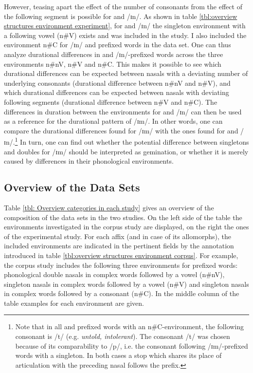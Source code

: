 However, teasing apart the effect of the number of consonants from the effect of the following segment is possible for  and /ɪn/. As shown in table \ref{tbl:overview structures environment experiment}, for  and /ɪn/ the singleton environment with a following vowel (n\#V) exists and was included in the study. I also included the environment n\#C for /ɪn/ and prefixed words in the data set.
 One can thus analyze durational differences in  and /ɪn/-prefixed words across the three environments  n\#nV, n\#V and n\#C. 
This makes it possible to see which durational differences can be expected between nasals with a deviating number of underlying consonants (durational difference between n\#nV and n\#V), and which durational differences can be expected between nasals with deviating following segments (durational difference between n\#V and n\#C). 
The differences in duration between the environments for  and /ɪn/ can then be used as a reference for the durational pattern of /ɪm/. 
In other words, one can compare the durational differences found for /ɪm/ with the ones found for  and /ɪn/.\footnote{Note that in all  and prefixed words with an n\#C-environment, the following consonant is /t/ (e.g. \textit{untold, intolerant}). The consonant /t/ was chosen because of its comparability to /p/, i.e. the consonant following /ɪm/-prefixed words with a singleton. In both cases a stop which shares its place of articulation with the preceding nasal follows the prefix.}
In turn, one can find out whether the potential difference between singletons and doubles for /ɪm/ should be interpreted as gemination, or whether it is merely caused by differences in their phonological environments.





\subsection{Overview of the Data Sets}

Table \ref{tbl: Overview categories in each study} gives an overview of the composition of the data sets in the two studies.
On the left side of the table the environments investigated in the corpus study are displayed, on the right the ones of the experimental study. 
For each affix (and in case of  its allomorphs), the included environments are indicated in the pertinent fields by the annotation introduced in table \ref{tbl:overview structures environment corpus}.
For example, the corpus study includes the following three environments for prefixed words: phonological double nasals in complex words followed by a vowel (n\#nV), singleton nasals in complex words followed by a vowel (n\#V) and singleton nasals in complex words followed by a consonant (n\#C). In the middle column of the table examples for each environment are given.

